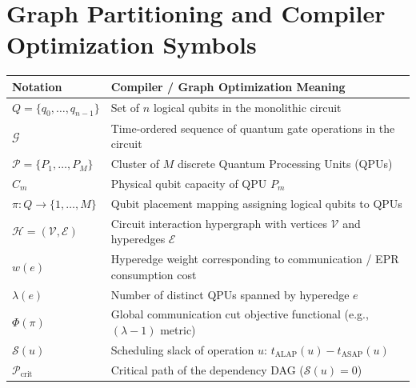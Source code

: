 \section*{Graph Partitioning and Compiler Optimization Symbols}

\begin{tabularx}{\textwidth}{lX}
    \toprule
    \textbf{Notation} & \textbf{Compiler / Graph Optimization Meaning} \\
    \midrule
    $Q = \{q_0, \dots, q_{n-1}\}$ & Set of $n$ logical qubits in the monolithic circuit \\
    $\mathcal{G}$ & Time-ordered sequence of quantum gate operations in the circuit \\
    $\mathcal{P} = \{P_1, \dots, P_M\}$ & Cluster of $M$ discrete Quantum Processing Units (QPUs) \\
    $C_m$ & Physical qubit capacity of QPU $P_m$ \\
    $\pi: Q \to \{1, \dots, M\}$ & Qubit placement mapping assigning logical qubits to QPUs \\
    $\mathcal{H} = (\mathcal{V}, \mathcal{E})$ & Circuit interaction hypergraph with vertices $\mathcal{V}$ and hyperedges $\mathcal{E}$ \\
    $w(e)$ & Hyperedge weight corresponding to communication / EPR consumption cost \\
    $\lambda(e)$ & Number of distinct QPUs spanned by hyperedge $e$ \\
    $\Phi(\pi)$ & Global communication cut objective functional (e.g., $(\lambda-1)$ metric) \\
    $\mathcal{S}(u)$ & Scheduling slack of operation $u$: $t_{\text{ALAP}}(u) - t_{\text{ASAP}}(u)$ \\
    $\mathcal{P}_{\text{crit}}$ & Critical path of the dependency DAG ($\mathcal{S}(u) = 0$) \\
    \bottomrule
\end{tabularx}
